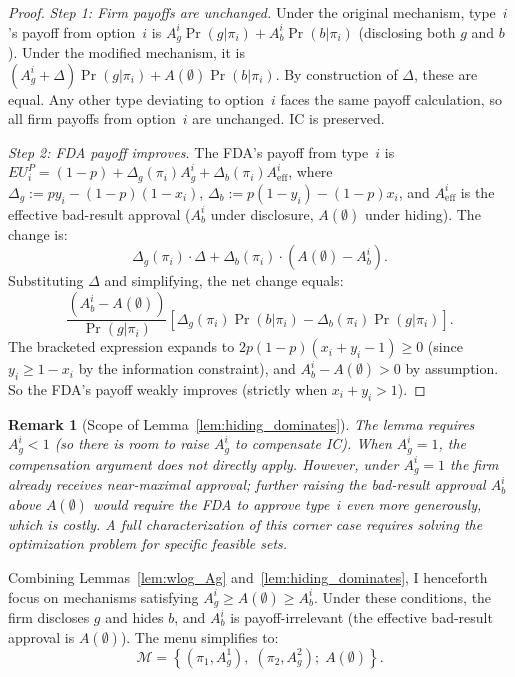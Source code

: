 \documentclass[12pt,a4paper]{article}
\newtheorem{remark}{Remark}
\begin{document}
\begin{proof}
\emph{Step 1: Firm payoffs are unchanged.}
Under the original mechanism, type~$i$'s payoff from option~$i$
is $A_g^i \Pr(g|\pi_i) + A_b^i \Pr(b|\pi_i)$ (disclosing both
$g$ and $b$). Under the modified mechanism, it is
$(A_g^i + \Delta) \Pr(g|\pi_i) + A(\emptyset) \Pr(b|\pi_i)$.
By construction of $\Delta$, these are equal. Any other type
deviating to option~$i$ faces the same payoff calculation, so
all firm payoffs from option~$i$ are unchanged. IC is
preserved.

\emph{Step 2: FDA payoff improves.}
The FDA's payoff from type~$i$ is
$EU^P_i = (1-p) + \Delta_g(\pi_i) A_g^i
+ \Delta_b(\pi_i) A_{\text{eff}}^i$, where
$\Delta_g := py_i - (1-p)(1-x_i)$,
$\Delta_b := p(1-y_i) - (1-p)x_i$, and $A_{\text{eff}}^i$ is
the effective bad-result approval ($A_b^i$ under disclosure,
$A(\emptyset)$ under hiding). The change is:
\[
  \Delta_g(\pi_i) \cdot \Delta
  + \Delta_b(\pi_i) \cdot (A(\emptyset) - A_b^i).
\]
Substituting $\Delta$ and simplifying, the net change equals:
\[
  \frac{(A_b^i - A(\emptyset))}{\Pr(g|\pi_i)}
  \left[\Delta_g(\pi_i) \Pr(b|\pi_i)
    - \Delta_b(\pi_i) \Pr(g|\pi_i)\right].
\]
The bracketed expression expands to
$2p(1-p)(x_i + y_i - 1) \geq 0$ (since $y_i \geq 1 - x_i$
by the information constraint), and
$A_b^i - A(\emptyset) > 0$ by assumption. So the FDA's payoff
weakly improves (strictly when $x_i + y_i > 1$).
\end{proof}

\begin{remark}[Scope of Lemma~\ref{lem:hiding_dominates}]
The lemma requires $A_g^i < 1$ (so there is room to raise
$A_g^i$ to compensate IC). When $A_g^i = 1$, the compensation
argument does not directly apply. However, under $A_g^i = 1$
the firm already receives near-maximal approval; further
raising the bad-result approval $A_b^i$ above $A(\emptyset)$
would require the FDA to approve type~$i$ even more
generously, which is costly. A full characterization of this
corner case requires solving the optimization problem for
specific feasible sets.
\end{remark}

Combining Lemmas~\ref{lem:wlog_Ag}
and~\ref{lem:hiding_dominates}, I henceforth focus on
mechanisms satisfying $A_g^i \geq A(\emptyset) \geq A_b^i$.
Under these conditions, the firm discloses $g$ and hides $b$,
and $A_b^i$ is payoff-irrelevant (the effective bad-result
approval is $A(\emptyset)$). The menu simplifies to:
\begin{equation}\label{eq:menu}
  \mathcal{M} = \left\{
    \left(\pi_1, A_g^1\right),\;
    \left(\pi_2, A_g^2\right);\;
    A(\emptyset)
  \right\}.
\end{equation}
\end{document}
